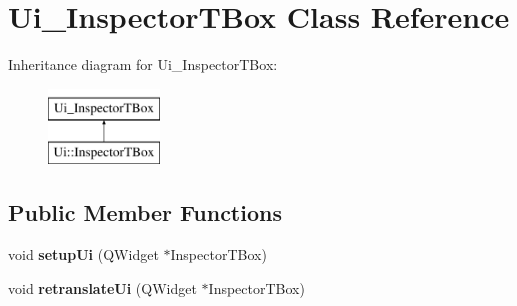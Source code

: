 \hypertarget{class_ui___inspector_t_box}{}\section{Ui\+\_\+\+Inspector\+T\+Box Class Reference}
\label{class_ui___inspector_t_box}
Inheritance diagram for Ui\+\_\+\+Inspector\+T\+Box\+:\begin{figure}[H]
\begin{center}
\leavevmode
\includegraphics[height=2.000000cm]{class_ui___inspector_t_box}
\end{center}
\end{figure}
\subsection*{Public Member Functions}
\begin{DoxyCompactItemize}
\item 
\mbox{\label{class_ui___inspector_t_box_a9f421889ab7f51e8e6a9f8333f12392d}} 
void {\bfseries setup\+Ui} (Q\+Widget $\ast$Inspector\+T\+Box)
\item 
\mbox{\label{class_ui___inspector_t_box_a6228cb82dfe326ba932d6a0e1329d04e}} 
void {\bfseries retranslate\+Ui} (Q\+Widget $\ast$Inspector\+T\+Box)
\end{DoxyCompactItemize}
